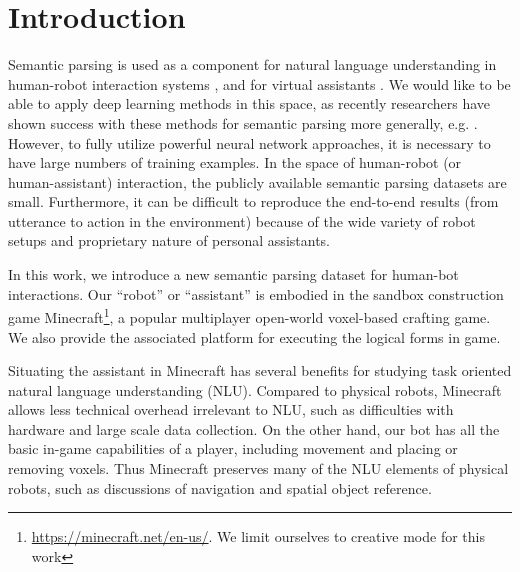 \section{Introduction} 
Semantic parsing is used as a component for natural language understanding in human-robot interaction systems \cite{lauria2001training, bos2007spoken, tellex2011understanding, matuszek2013learning, thomason2019improving}, and for virtual assistants  \cite{campagna2017almond, kollar2018alexa, campagna2019genie}.  We would like to be able to apply deep learning methods in this space, as recently researchers have shown success with these methods for semantic parsing more generally, e.g. \cite{dong2016language, jia2016data, zhong2017seq2sql}. However, to fully utilize powerful neural network approaches, it is necessary to have large numbers of training examples. In the space of human-robot (or human-assistant) interaction, the publicly available semantic parsing datasets are small. Furthermore, it can be difficult to reproduce the end-to-end results (from utterance to action in the environment) because of the wide variety of robot setups and proprietary nature of personal assistants.

In this work, we introduce a new semantic parsing dataset for human-bot interactions. Our ``robot'' or ``assistant''  is embodied in the sandbox construction game Minecraft\footnote{\url{https://minecraft.net/en-us/}.  We limit ourselves to creative mode for this work}, a popular multiplayer open-world voxel-based crafting game. We also provide the associated platform for executing the logical forms in game.

Situating the assistant in Minecraft has several benefits for studying task oriented natural language understanding (NLU). Compared to physical robots, Minecraft allows less technical overhead irrelevant to NLU, such as difficulties with hardware and large scale data collection. On the other hand, our bot has all the basic in-game capabilities of a player, including movement and placing or removing voxels. Thus Minecraft preserves many of the NLU elements of physical robots, such as discussions of navigation and spatial object reference. 
 


